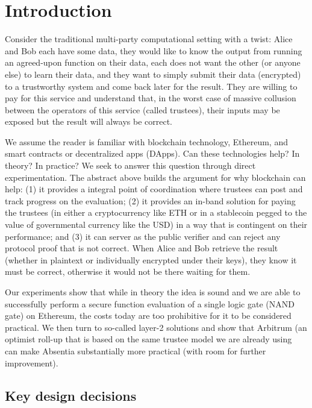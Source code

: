 
\section{Introduction}

Consider the traditional multi-party computational setting with a twist: Alice and Bob each have some data, they would like to know the output from running an agreed-upon function on their data, each does not want the other (or anyone else) to learn their data, and they want to simply submit their data (\eg encrypted) to a trustworthy system and come back later for the result. They are willing to pay for this service and understand that, in the worst case of massive collusion between the operators of this service (called trustees), their inputs may be exposed but the result will always be correct.

We assume the reader is familiar with blockchain technology, Ethereum, and smart contracts or decentralized apps (DApps). Can these technologies help? In theory? In practice? We seek to answer this question through direct experimentation. The abstract above builds the argument for why blockchain can help: (1) it provides a integral point of coordination where trustees can post and track progress on the evaluation; (2) it provides an in-band solution for paying the trustees (in either a cryptocurrency like ETH or in a stablecoin pegged to the value of governmental currency like the USD) in a way that is contingent on their performance; and (3) it can server as the public verifier and can reject any protocol proof that is not correct. When Alice and Bob retrieve the result (whether in plaintext or individually encrypted under their keys), they know it must be correct, otherwise it would not be there waiting for them.

Our experiments show that while in theory the idea is sound and we are able to successfully perform a secure function evaluation of a single logic gate (NAND gate) on Ethereum, the costs today are too prohibitive for it to be considered practical. We then turn to so-called layer-2 solutions and show that Arbitrum (an optimist roll-up that is based on the same trustee model we are already using~\cite{KGCWF18} can make Absentia substantially more practical (with room for further improvement).
 
\subsection{Key design decisions}

